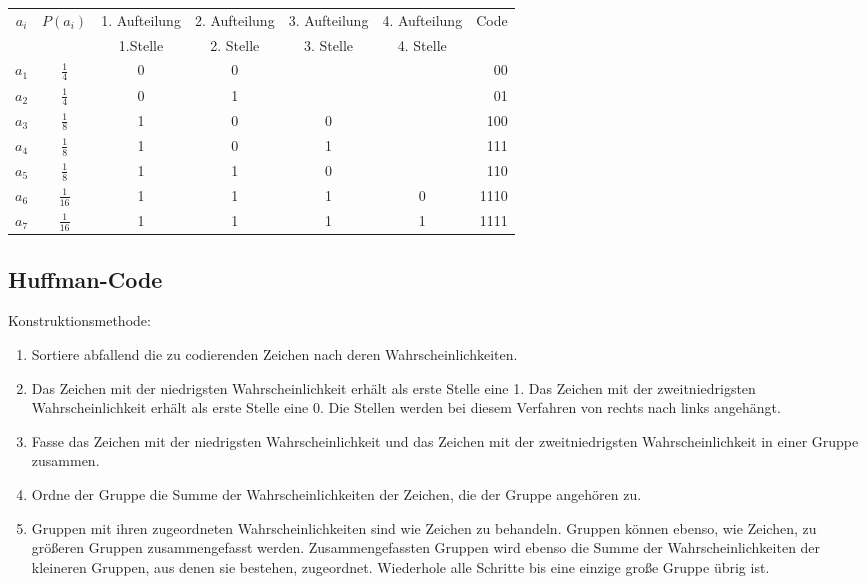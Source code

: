 \begin{center}
\begin{tabular}{cc*{4}{c}r}
	$a_i$ & $P(a_i)$       & 1. Aufteilung & 2. Aufteilung & 3. Aufteilung & 4. Aufteilung & Code \\
	      &                & 1.Stelle      & 2. Stelle     & 3. Stelle     & 4. Stelle     &      \\
	$a_1$ & $\frac{1}{4}$  & 0             & 0             &               &               & 00   \\
	$a_2$ & $\frac{1}{4}$  & 0             & 1             &               &               & 01   \\
	$a_3$ & $\frac{1}{8}$  & 1             & 0             & 0             &               & 100  \\
	$a_4$ & $\frac{1}{8}$  & 1             & 0             & 1             &               & 111  \\
	$a_5$ & $\frac{1}{8}$  & 1             & 1             & 0             &               & 110  \\
	$a_6$ & $\frac{1}{16}$ & 1             & 1             & 1             & 0             & 1110 \\
	$a_7$ & $\frac{1}{16}$ & 1             & 1             & 1             & 1             & 1111 \\
\end{tabular}
\end{center}

\subsection{Huffman-Code}
Konstruktionsmethode:
\begin{enumerate}
  \item Sortiere abfallend die zu codierenden Zeichen nach deren Wahrscheinlichkeiten.
  \item Das Zeichen mit der niedrigsten Wahrscheinlichkeit erhält als erste Stelle eine 1. Das Zeichen mit der zweitniedrigsten Wahrscheinlichkeit erhält als erste Stelle eine 0. Die Stellen werden bei diesem Verfahren von rechts nach links angehängt.
  \item Fasse das Zeichen mit der niedrigsten Wahrscheinlichkeit und das Zeichen mit der zweitniedrigsten Wahrscheinlichkeit in einer Gruppe zusammen.
  \item Ordne der Gruppe die Summe der Wahrscheinlichkeiten der Zeichen, die der Gruppe angehören zu.
  \item Gruppen mit ihren zugeordneten Wahrscheinlichkeiten sind wie Zeichen zu behandeln. Gruppen können ebenso, wie Zeichen, zu größeren Gruppen zusammengefasst werden. Zusammengefassten Gruppen wird ebenso die Summe der Wahrscheinlichkeiten der kleineren Gruppen, aus denen sie bestehen, zugeordnet. Wiederhole alle Schritte bis eine einzige große Gruppe übrig ist.
\end{enumerate}

